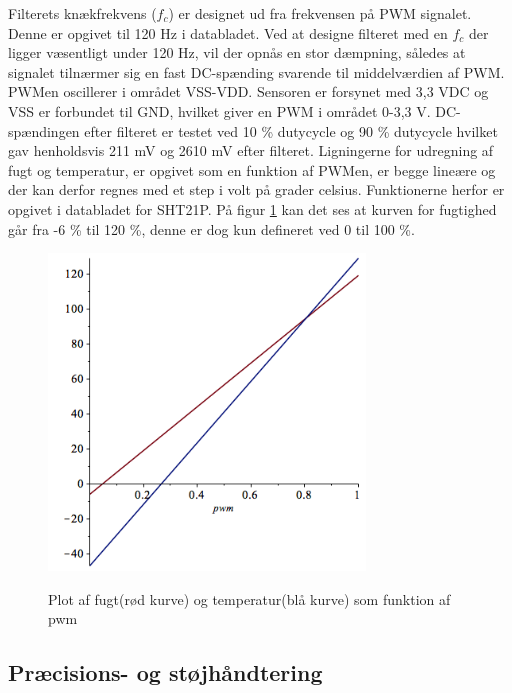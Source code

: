 Filterets knækfrekvens ($f_c$) er designet ud fra frekvensen på PWM signalet. Denne er opgivet til 120 Hz i databladet. Ved at designe filteret med en $f_c$ der ligger væsentligt under 120 Hz, vil der opnås en stor dæmpning, således at signalet tilnærmer sig en fast DC-spænding svarende til middelværdien af PWM. PWMen oscillerer i området VSS-VDD. Sensoren er forsynet med 3,3 VDC og VSS er forbundet til GND, hvilket giver en PWM i området 0-3,3 V. DC-spændingen efter filteret er testet ved 10 \% dutycycle og 90 \% dutycycle hvilket gav henholdsvis 211 mV og 2610 mV efter filteret. Ligningerne for udregning af fugt og temperatur, er opgivet som en funktion af PWMen, er begge lineære og der kan derfor regnes med et step i volt på grader celsius. Funktionerne herfor er opgivet i databladet for SHT21P. 
På figur \ref{lab:sht_plot_mable} kan det ses at kurven for fugtighed går fra -6 \% til 120 \%, denne er dog kun defineret ved 0 til 100 \%. 

\begin{figure}[htb]
\centering
{\includegraphics[width=0.75\textwidth]{filer/design/Billeder/sht_plot_maple.png}}
\caption{Plot af fugt(rød kurve) og temperatur(blå kurve) som funktion af pwm}
\label{lab:sht_plot_mable}
\end{figure}

\subsection{Præcisions- og støjhåndtering}


